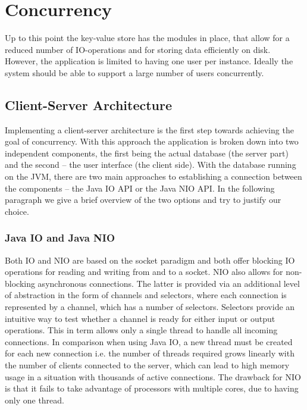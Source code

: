 \documentclass[a4paper, twocolumn,11pt]{article}
\begin{document}
\section{Concurrency}
Up to this point the key-value store has the modules in place, that allow for a reduced number of IO-operations and for storing data efficiently on disk. However, the application is limited to having one user per instance. Ideally the system should be able to support a large number of users concurrently.

\subsection{Client-Server Architecture}
Implementing a client-server architecture is the first step towards achieving the goal of concurrency. With this approach the application is broken down into two independent components, the first being the actual database (the server part) and the second – the user interface (the client side). With the database running on the JVM, there are two main approaches to establishing a connection between the components – the Java IO API or the Java NIO API. In the following paragraph we give a brief overview of the two options and try to justify our choice.

\subsubsection{Java IO and Java NIO}
Both IO and NIO are based on the socket paradigm and both offer blocking IO operations for reading and writing from and to a socket. NIO also allows for non-blocking asynchronous connections. The latter is provided via an additional level of abstraction in the form of channels and selectors, where each connection is represented by a channel, which has a number of selectors. Selectors provide an intuitive way to test whether a channel is ready for either input or output operations. This in term allows only a single thread to handle all incoming connections. In comparison when using Java IO, a new thread must be created for each new connection i.e. the number of threads required grows linearly with the number of clients connected to the server, which can lead to high memory usage in a situation with thousands of active connections. The drawback for NIO is that it fails to take advantage of processors with multiple cores, due to having only one thread. 
\end{document}

